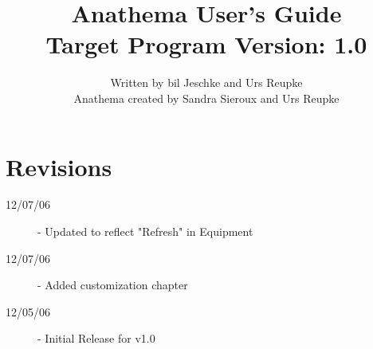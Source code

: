 \documentclass[]{report}
\title{Anathema User's Guide\\ Target Program Version: 1.0}
\author{Written by bil Jeschke and Urs Reupke \\ Anathema created by Sandra Sieroux and Urs Reupke}
\date{}
\begin{document}
\maketitle
\sffamily
{}
\tableofcontents
\pagebreak
\setcounter{page}{1}





\appendix


\chapter*{Revisions}
\begin{description}
\item[12/07/06] - Updated to reflect "Refresh" in Equipment
\item[12/07/06] - Added customization chapter
\item[12/05/06] - Initial Release for v1.0
\end{description}
\end{document}
